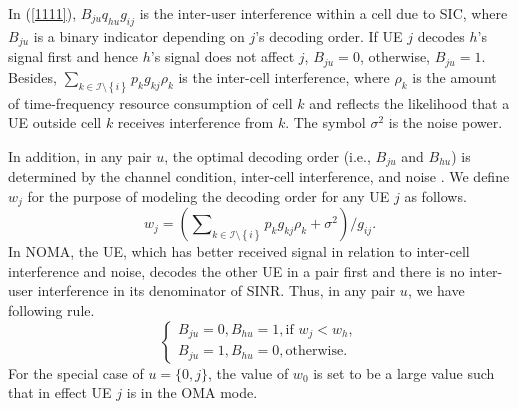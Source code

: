 \documentclass[10pt,journal,final,finalsubmission,twocolumn]{IEEEtran}
\begin{document}
In (\ref{1111}), $B_{ju}q_{hu}g_{ij}$ is the inter-user interference within a cell due to SIC, where $B_{ju}$ is a binary indicator depending on $j$'s decoding order. If UE $j$ decodes $h$'s signal first and hence $h$'s signal does not affect $j$, $B_{ju} = 0$, otherwise, $B_{ju} = 1$. Besides, ${\sum_{k\in \mathcal{I}\setminus \left \{ i \right \}}p_kg_{kj}\rho_k}$ is the inter-cell interference, where $\rho_k$ is the amount of time-frequency resource consumption of cell $k$ and reflects the likelihood that a UE outside cell $k$ receives interference from $k$. The symbol $\sigma^2$ is the noise power.

In addition, in any pair $u$, the optimal decoding order (i.e., $B_{ju}$ and $B_{hu}$) is determined by the channel condition, inter-cell interference, and noise \cite{41}. We define $w_j$ for the purpose of modeling the decoding order for any UE $j$ as follows. 
\begin{equation}
w_j=  \left(\sum \nolimits_{k \in \mathcal{I}\setminus \left \{ i \right \} }p_k g_{kj}\rho_k+\sigma ^2   \right) / g_{ij} .
\end{equation}
In NOMA, the UE, which has better received signal in relation to inter-cell interference and noise, decodes the other UE in a pair first and there is no inter-user interference in its denominator of SINR. Thus, in any pair $u$, we have following rule. 
\begin{equation}\label{rule}
\left\{\begin{array}{l}
B_{ju} = 0,B_{hu} =1, \text{if } w_j < w_h,\\
B_{ju} = 1,B_{hu} =0, \text{otherwise}.
\end{array}\right.
\end{equation}
For the special case of $u = \{0, j\}$, the value of $w_0$ is set to be a large value such that in effect UE $j$ is in the OMA mode.
\end{document}
